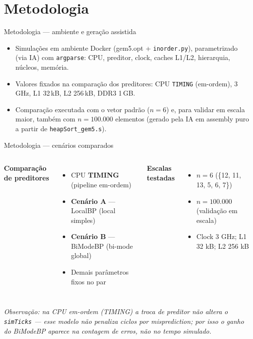 \documentclass[aspectratio=169,11pt]{beamer}
\begin{document}
\section{Metodologia}

\begin{frame}{Metodologia --- ambiente e geração assistida}
  \begin{itemize}
    \item Simulações em ambiente Docker (gem5.opt + \texttt{inorder.py}),
          parametrizado (via IA) com \texttt{argparse}: CPU, preditor,
          clock, caches L1/L2, hierarquia, núcleos, memória.
    \item Valores fixados na comparação dos preditores: CPU \texttt{TIMING}
          (em-ordem), 3\,GHz, L1 32\,kB, L2 256\,kB, DDR3 1\,GB.
    \item Comparação executada com o vetor padrão ($n=6$) e, para validar em
          escala maior, também com $n=100.000$ elementos (gerado pela IA em
          assembly puro a partir de \texttt{heapSort\_gem5.s}).
  \end{itemize}
\end{frame}

\begin{frame}{Metodologia --- cenários comparados}
  \begin{columns}[t]
      \textbf{Comparação de preditores}
      \begin{itemize}
        \item CPU \textbf{TIMING} (pipeline em-ordem)
        \item \textbf{Cenário A} --- LocalBP (local simples)
        \item \textbf{Cenário B} --- BiModeBP (bi-mode global)
        \item Demais parâmetros fixos no par
      \end{itemize}
      \textbf{Escalas testadas}
      \begin{itemize}
        \item $n=6$ (\{12, 11, 13, 5, 6, 7\})
        \item $n=100.000$ (validação em escala)
        \item Clock 3 GHz; L1 32 kB; L2 256 kB
      \end{itemize}
  \end{columns}
  \vfill
  \footnotesize\textit{Observação: na CPU em-ordem (TIMING) a troca de preditor
  não altera o \texttt{simTicks} --- esse modelo não penaliza ciclos por
  \emph{misprediction}; por isso o ganho do BiModeBP aparece na contagem de
  erros, não no tempo simulado.}
\end{frame}
\end{document}
